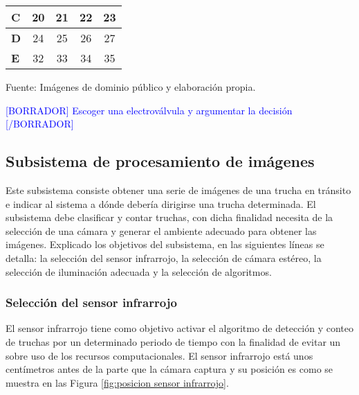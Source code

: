 \begin{itemize}
\begin{mytable}[H]
\begin{tabular}{l|c|c|c|c|}
			\multicolumn{1}{|l|}{\textbf{C}}          & 20                                                                    & 21         & 22         & 23         \\ \hline
			\multicolumn{1}{|l|}{\textbf{D}}          & 24                                                                    & 25         & 26         & 27         \\ \hline
			\multicolumn{1}{|l|}{\textbf{E}}          & 32                                                                    & 33         & 34         & 35         \\ \hline
		\end{tabular}	
		\begin{flushleft}			
			Fuente: Imágenes de dominio público y elaboración propia. 
		\end{flushleft}
	\end{mytable}
	
	\textcolor{blue}{[BORRADOR] Escoger una electroválvula y argumentar la decisión [/BORRADOR]}
	
	
\end{itemize}


\subsection{Subsistema de procesamiento de imágenes}
\label{ssec:subsistema de procesamiento de imágenes}

Este subsistema consiste obtener una serie de imágenes de una trucha en tránsito e indicar al sistema a dónde debería dirigirse una trucha determinada. El subsistema debe clasificar y contar truchas, con dicha finalidad necesita de la selección de una cámara y generar el ambiente adecuado para obtener las imágenes. Explicado los objetivos del subsistema, en las siguientes líneas se detalla: la selección del sensor infrarrojo, la selección de cámara estéreo, la selección de iluminación adecuada y la selección de algoritmos.

\subsubsection{Selección del sensor infrarrojo}

El sensor infrarrojo tiene como objetivo activar el algoritmo de detección y conteo de truchas por un determinado periodo de tiempo con la finalidad de evitar un sobre uso de los recursos computacionales. El sensor infrarrojo está unos centímetros antes de la parte que la cámara captura y su posición es como se muestra en las Figura \ref{fig:posicion sensor infrarrojo}.

